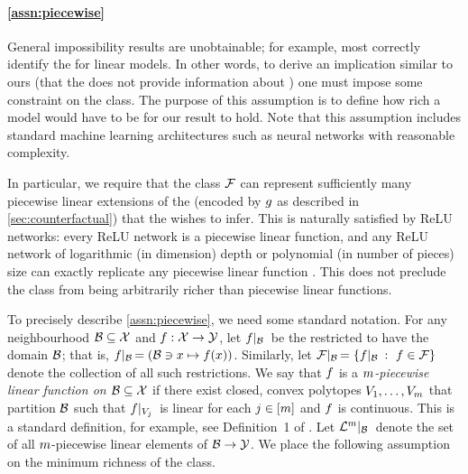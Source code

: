 %
\paragraph{\cref{assn:piecewise} \intuitive{}}
General impossibility results are unobtainable; for example, most \fielddefnames{} correctly identify the \modelname{} for linear models. In other words, to derive an implication similar to ours (that the \covname{} \attname{} does not provide information about \countmodbehaviourname{}) one must impose some constraint on the \modelname{} class.
The purpose of this assumption is to define how rich a model would have to be for our result to hold. Note that this assumption
%
includes standard machine learning architectures such as neural networks with reasonable complexity.
%
%

In particular, we require that the \modelname{} class $\mathcal{F}$ can represent sufficiently many piecewise linear extensions of the \localname{} \countmodbehaviourname{} (encoded by $g$ as described in \cref{sec:counterfactual}) that the \username{} wishes to infer.
This is naturally satisfied by ReLU networks: every ReLU network is a piecewise linear function, and any ReLU network of logarithmic (in dimension) depth or polynomial (in number of pieces) size can exactly replicate any piecewise linear function \citep[for precise bounds, see][]{arora18relu,tanielian21groupsort,chen22piecewise}.
This does not preclude the \modelname{} class from being arbitrarily richer than piecewise linear functions.


To precisely describe \cref{assn:piecewise}, we need some standard notation.
For any neighbourhood $\mathcal{B}\subseteq\mathcal{X}$ and \modelname{} $f:\mathcal{X}\to\mathcal{Y}$, let $f\lvert_{\mathcal{B}}\,$ be the \modelname{} restricted to have the domain $\mathcal{B}$; that is, $f\lvert_{\mathcal{B}}\, = (\mathcal{B}\ni x\mapsto f(x))$.
Similarly, let $\mathcal{F}\lvert_{\mathcal{B}}\, = \{f\lvert_{\mathcal{B}}\,\ : \ f\in\mathcal{F}\}$ denote the collection of all such restrictions.
We say that $f$ is a \emph{$m$-piecewise linear function on $\mathcal{B}\subseteq\mathcal{X}$} if there exist closed, convex polytopes $V_{1},\dots,V_{m}$ that partition $\mathcal{B}$ such that $f\lvert_{V_{j}}\,$ is linear for each $j\in[m]$ and $f$ is continuous.
%
This is a standard definition, for example, see Definition~1 of \citet{chen22piecewise}.
Let $\mathcal{L}^{m}\lvert_{\mathcal{B}}\,$ denote the set of all $m$-piecewise linear elements of $\mathcal{B}\to\mathcal{Y}$.
%
We place the following assumption on the minimum richness of the \modelname{} class.
%

